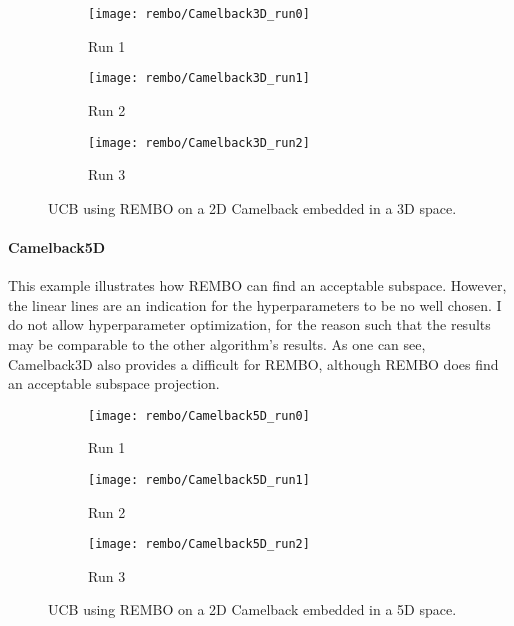 \begin{figure}[H]
\center
    \begin{subfigure}[b]{0.30\textwidth}
        \texttt{[image: rembo/Camelback3D\_run0]}
        \label{fig:gull}
         \caption{Run 1}
    \end{subfigure}
        \begin{subfigure}[b]{0.30\textwidth}
        \texttt{[image: rembo/Camelback3D\_run1]}
        \label{fig:gull}
        \caption{Run 2}
    \end{subfigure}
    \begin{subfigure}[b]{0.30\textwidth}
        \texttt{[image: rembo/Camelback3D\_run2]}
        \label{fig:gull}
               \caption{Run 3}
    \end{subfigure}
        \caption{UCB using REMBO on a 2D Camelback embedded in a 3D space.
    }\label{fig:animals}
\end{figure}

\paragraph{Camelback5D}
This example illustrates how REMBO can find an acceptable subspace.
However, the linear lines are an indication for the hyperparameters to be no well chosen. 
I do not allow hyperparameter optimization, for the reason such that the results may be comparable to the other algorithm's results.
As one can see, Camelback3D also provides a difficult for REMBO, although REMBO does find an acceptable subspace projection.

\begin{figure}[H]
\center
    \begin{subfigure}[b]{0.30\textwidth}
        \texttt{[image: rembo/Camelback5D\_run0]}
        \label{fig:gull}
         \caption{Run 1}
    \end{subfigure}
        \begin{subfigure}[b]{0.30\textwidth}
        \texttt{[image: rembo/Camelback5D\_run1]}
        \label{fig:gull}
        \caption{Run 2}
    \end{subfigure}
    \begin{subfigure}[b]{0.30\textwidth}
        \texttt{[image: rembo/Camelback5D\_run2]}
        \label{fig:gull}
               \caption{Run 3}
    \end{subfigure}
        \caption{UCB using REMBO on a 2D Camelback embedded in a 5D space.
    }\label{fig:animals}
\end{figure}








